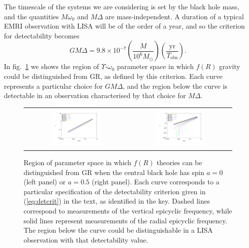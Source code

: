 \documentclass[aps,prd,amsfonts,amssymb,amsmath,nofootinbib,reprint,showpacs]{revtex4-1}
\newcommand{\eqnref}[1]{(\ref{eq:#1})}
\newcommand{\figref}[1]{fig.\ \ref{fig:#1}}
\newcommand{\sub}[1]{\ensuremath{_\text{#1}}}
\begin{document}
The timescale of the systems we are considering is set by the black hole mass, and the quantities $M\omega_0$ and $M\Delta$ are mass-independent. A duration of a typical EMRI observation with LISA will be of the order of a year, and so the criterion for detectability becomes
\begin{equation}
GM\Delta = 9.8\times10^{-7} \left(\frac{M}{10^6 M_{\odot}}\right) \left(\frac{\mathrm{yr}}{T\sub{obs}}\right). \label{eq:detcrit}
\end{equation}
In \figref{epifig} we shows the region of $\Upsilon$-$\omega_0$ parameter space in which $f(R)$ gravity could be distinguished from GR, as defined by this criterion. Each curve represents a particular choice for $GM\Delta$, and the region below the curve is detectable in an observation characterised by that choice for $M\Delta$.
\begin{figure}[htbp]
\begin{tabular}{cc}
\includegraphics[width=0.5\textwidth]{EpicycleConstraintsa0}&
\includegraphics[width=0.5\textwidth]{EpicycleConstraintsa05}
\end{tabular}
\caption{\label{fig:epifig}Region of parameter space in which $f(R)$ theories can be distinguished from GR when the central black hole has spin $a=0$ (left panel) or $a=0.5$ (right panel). Each curve corresponds to a particular specification of the detectability criterion given in \eqnref{detcrit} in the text, as identified in the key. Dashed lines correspond to measurements of the vertical epicyclic frequency, while solid lines represent measurements of the radial epicyclic frequency. The region below the curve could be distinguishable in a LISA observation with that detectability value.}
\end{figure}
\end{document}
